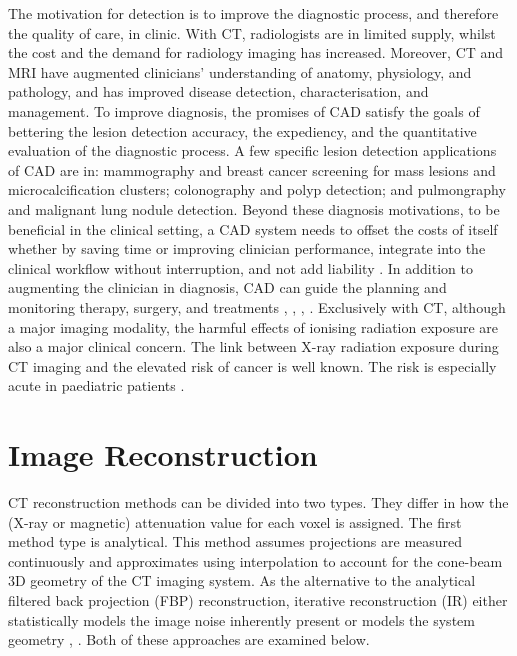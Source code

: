 \documentclass{bmcart}
\begin{document}
\par The motivation for detection is to improve the diagnostic process, and therefore the quality of care, in clinic. With CT, radiologists are in limited supply, whilst the cost and the demand for radiology imaging has increased. Moreover, CT and MRI have augmented clinicians' understanding of anatomy, physiology, and pathology, and has improved disease detection, characterisation, and management. To improve diagnosis, the promises of CAD satisfy the goals of bettering the lesion detection accuracy, the expediency, and the quantitative evaluation of the diagnostic process. A few specific lesion detection applications of CAD are in: mammography and breast cancer screening for mass lesions and microcalcification clusters; colonography and polyp detection; and pulmongraphy and malignant lung nodule detection. Beyond these diagnosis motivations, to be beneficial in the clinical setting, a CAD system needs to offset the costs of itself whether by saving time or improving clinician performance, integrate into the clinical workflow without interruption, and not add liability \cite{van_ginneken_computer-aided_2011}. In addition to augmenting the clinician in diagnosis, CAD can guide the planning and monitoring therapy, surgery, and treatments \cite{hutton_software_2003}, \cite{banik_landmarking_2009}, \cite{pham_current_2000}, \cite{sharma_automated_2010}. Exclusively with CT, although a major imaging modality, the harmful effects of ionising radiation exposure are also a major clinical concern. The link between X-ray radiation exposure during CT imaging and the elevated risk of cancer is well known. The risk is especially acute in paediatric patients \cite{liu_model-based_2014}.

\section*{Image Reconstruction}
CT reconstruction methods can be divided into two types. They differ in how the (X-ray or magnetic) attenuation value for each voxel is assigned. The first method type is analytical. This method assumes projections are measured continuously and approximates using interpolation to account for the cone-beam 3D geometry of the CT imaging system. As the alternative to the analytical filtered back projection (FBP) reconstruction, iterative reconstruction (IR) either statistically models the image noise inherently present or models the system geometry \cite{geyer_state_2015}, \cite{beister_iterative_2012}. Both of these approaches are examined below.
\end{document}
